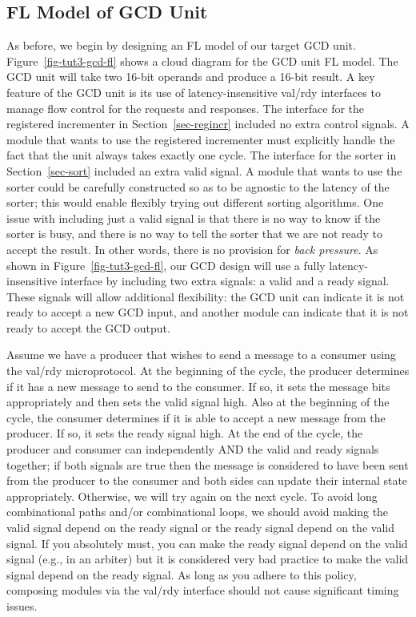 \documentclass{cbxdoc}
\begin{document}
\subsection{FL Model of GCD Unit}



As before, we begin by designing an FL model of our target GCD unit.
Figure~\ref{fig-tut3-gcd-fl} shows a cloud diagram for the GCD unit FL
model. The GCD unit will take two 16-bit operands and produce a 16-bit
result. A key feature of the GCD unit is its use of latency-insensitive
val/rdy interfaces to manage flow control for the requests and responses.
The interface for the registered incrementer in Section~\ref{sec-regincr}
included no extra control signals. A module that wants to use the
registered incrementer must explicitly handle the fact that the unit
always takes exactly one cycle. The interface for the sorter in
Section~\ref{sec-sort} included an extra valid signal. A module that
wants to use the sorter could be carefully constructed so as to be
agnostic to the latency of the sorter; this would enable flexibly trying
out different sorting algorithms. One issue with including just a valid
signal is that there is no way to know if the sorter is busy, and there
is no way to tell the sorter that we are not ready to accept the result.
In other words, there is no provision for \emph{back pressure}. As shown
in Figure~\ref{fig-tut3-gcd-fl}, our GCD design will use a fully
latency-insensitive interface by including two extra signals: a valid and
a ready signal. These signals will allow additional flexibility: the GCD
unit can indicate it is not ready to accept a new GCD input, and another
module can indicate that it is not ready to accept the GCD output.

Assume we have a producer that wishes to send a message to a consumer
using the val/rdy microprotocol. At the beginning of the cycle, the
producer determines if it has a new message to send to the consumer. If
so, it sets the message bits appropriately and then sets the valid signal
high. Also at the beginning of the cycle, the consumer determines if it
is able to accept a new message from the producer. If so, it sets the
ready signal high. At the end of the cycle, the producer and consumer can
independently AND the valid and ready signals together; if both signals
are true then the message is considered to have been sent from the
producer to the consumer and both sides can update their internal state
appropriately. Otherwise, we will try again on the next cycle. To avoid
long combinational paths and/or combinational loops, we should avoid
making the valid signal depend on the ready signal or the ready signal
depend on the valid signal. If you absolutely must, you can make the
ready signal depend on the valid signal (e.g., in an arbiter) but it is
considered very bad practice to make the valid signal depend on the ready
signal. As long as you adhere to this policy, composing modules via the
val/rdy interface should not cause significant timing issues.
\end{document}
